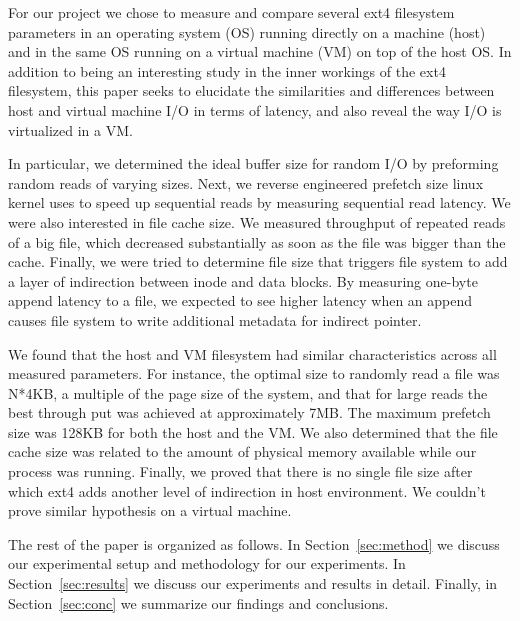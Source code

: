 For our project we chose to measure and compare several ext4 filesystem parameters
in an operating system (OS) running directly on a machine (host) and in the same 
OS running on a virtual machine (VM) on top of the host OS. In addition to being an 
interesting study in the inner workings of the ext4 filesystem, this paper seeks to
elucidate the similarities and differences between host and virtual machine I/O in
terms of latency, and also reveal the way I/O is virtualized in a VM.

In particular, we determined the ideal buffer size for random I/O by preforming random reads
of varying sizes. Next, we reverse engineered prefetch size linux kernel uses to speed up
sequential reads by measuring sequential read latency. We were also interested in file cache size.
We measured throughput of repeated reads of a big file, which decreased substantially as soon
as the file was bigger than the cache. Finally, we were tried to determine file size that triggers 
file system to add a layer of indirection between inode and data blocks. By measuring one-byte
append latency to a file, we expected to see higher latency when an append causes file system
to write additional metadata for indirect pointer.

We found that the host and VM filesystem had similar characteristics across all measured parameters. For instance, the 
optimal size to randomly read a file was N*4KB, a multiple of the page size of the 
system, and that for large reads the best through put was achieved at approximately
7MB. The maximum prefetch size was 128KB for both the host and the VM. We also 
determined that the file cache size was related to the amount of physical memory 
available while our process was running. Finally, we proved that there is no single file
size after which ext4 adds another level of indirection in host environment. We couldn't prove
similar hypothesis on a virtual machine.

The rest of the paper is organized as follows. In Section~\ref{sec:method} we 
discuss our experimental setup and methodology for our experiments. In 
Section~\ref{sec:results} we discuss our experiments and results in detail. 
Finally, in Section~\ref{sec:conc} we summarize our findings and conclusions.

